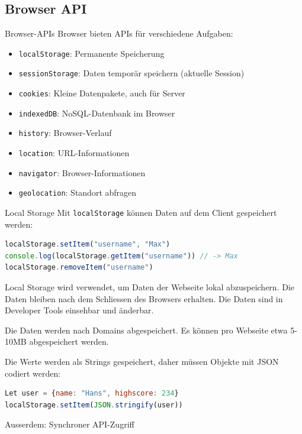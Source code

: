 \pagebreak

\subsection{Browser API}

\begin{concept}{Browser-APIs}
    Browser bieten APIs für verschiedene Aufgaben:
    \begin{itemize}
        \item \texttt{localStorage}: Permanente Speicherung
        \item \texttt{sessionStorage}: Daten temporär speichern (aktuelle Session)
        \item \texttt{cookies}: Kleine Datenpakete, auch für Server
        \item \texttt{indexedDB}: NoSQL-Datenbank im Browser
        \item \texttt{history}: Browser-Verlauf
        \item \texttt{location}: URL-Informationen
        \item \texttt{navigator}: Browser-Informationen
        \item \texttt{geolocation}: Standort abfragen
    \end{itemize}
\end{concept}

\begin{definition}{Local Storage}
Mit \texttt{localStorage} können Daten auf dem Client gespeichert werden:
\begin{lstlisting}[language=JavaScript, style=basesmol]
localStorage.setItem("username", "Max")
console.log(localStorage.getItem("username")) // -> Max
localStorage.removeItem("username")
\end{lstlisting}

Local Storage wird verwendet, um Daten der Webseite lokal abzuspeichern. Die Daten bleiben nach dem Schliessen des Browsers erhalten. Die Daten sind in Developer Tools einsehbar und änderbar.

Die Daten werden nach Domains abgespeichert. Es können pro Webseite etwa 5-10MB abgespeichert werden.

Die Werte werden als Strings gespeichert, daher müssen Objekte mit JSON codiert werden:
\begin{lstlisting}[language=JavaScript, style=basesmol]
Let user = {name: "Hans", highscore: 234}
localStorage.setItem(JSON.stringify(user))
\end{lstlisting}
Ausserdem: Synchroner API-Zugriff
\end{definition}


